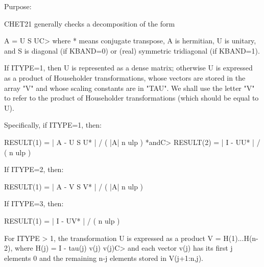 \begin{DoxyParagraph}{Purpose\+: }
\begin{DoxyVerb} CHET21 generally checks a decomposition of the form

    A = U S UC>
 where * means conjugate transpose, A is hermitian, U is unitary, and
 S is diagonal (if KBAND=0) or (real) symmetric tridiagonal (if
 KBAND=1).

 If ITYPE=1, then U is represented as a dense matrix; otherwise U is
 expressed as a product of Householder transformations, whose vectors
 are stored in the array "V" and whose scaling constants are in "TAU".
 We shall use the letter "V" to refer to the product of Householder
 transformations (which should be equal to U).

 Specifically, if ITYPE=1, then:

    RESULT(1) = | A - U S U* | / ( |A| n ulp ) *andC>    RESULT(2) = | I - UU* | / ( n ulp )

 If ITYPE=2, then:

    RESULT(1) = | A - V S V* | / ( |A| n ulp )

 If ITYPE=3, then:

    RESULT(1) = | I - UV* | / ( n ulp )

 For ITYPE > 1, the transformation U is expressed as a product
 V = H(1)...H(n-2),  where H(j) = I  -  tau(j) v(j) v(j)C> and each
 vector v(j) has its first j elements 0 and the remaining n-j elements
 stored in V(j+1:n,j).\end{DoxyVerb}
 
\end{DoxyParagraph}

